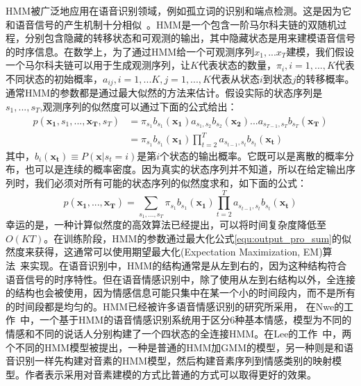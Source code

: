HMM被广泛地应用在语音识别领域，例如孤立词的识别和端点检测。这是因为它和语音信号的产生机制十分相似~\cite{Rabiner2007An}。HMM是一个包含一阶马尔科夫链的双随机过程，分别包含隐藏的转移状态和可观测的输出，其中隐藏状态是用来建模语音信号的时序信息。在数学上，为了通过HMM给一个可观测序列$x_1,...x_T$建模，我们假设一个马尔科夫链可以用于生成观测序列，让$K$代表状态的数量，$\pi_i, i=1,...,K$代表不同状态的初始概率，$a_{ij}, i=1,...K, j=1,...,K$代表从状态$i$到状态$j$的转移概率。通常HMM的参数都是通过最大似然的方法来估计。假设实际的状态序列是$s_1,...,s_T$,观测序列的似然度可以通过下面的公式给出：
\begin{equation}
\label{equ:output_pro}
    \begin{aligned}
        p(\mathbf{x_1},s_1,...,\mathbf{x_T},s_T) &= \pi_{s_1}b_{s_1}(\mathbf{x_1})a_{s_1,s_2}b_{s_2}(\mathbf{x_2})...a_{s_{T-1},s_T}b_{s_T}(\mathbf{x_T}) \\
        &= \pi_{s_1}b_{s_1}(\mathbf{x_1})\prod\limits_{t=2}^Ta_{s_{t-1},s_t}b_{s_t}(\mathbf{x_t})
    \end{aligned}
\end{equation}
其中，$b_i(\mathbf{x_t}) \equiv P(\mathbf{x}|s_t = i)$是第$i$个状态的输出概率。它既可以是离散的概率分布，也可以是连续的概率密度。因为真实的状态序列并不知道，所以在给定输出序列时，我们必须对所有可能的状态序列的似然度求和，如下面的公式：
\begin{equation}
\label{equ:output_pro_sum}
        p(\mathbf{x_1},...,\mathbf{x_T}) = \sum\limits_{s_1,...,s_T}\pi_{s_1}b_{s_1}(\mathbf{x_1})\prod\limits_{t=2}^Ta_{s_{t-1},s_t}b_{s_t}(\mathbf{x_t})
\end{equation}
幸运的是，一种计算似然度的高效算法已经提出，可以将时间复杂度降低至$O(KT)$。在训练阶段，HMM的参数通过最大化公式\ref{equ:output_pro_sum}的似然度来获得，这通常可以使用期望最大化(Expectation Maximization, EM)算法~\cite{Dempster1977Maximum}来实现。在语音识别中，HMM的结构通常是从左到右的，因为这种结构符合语音信号的时序特性。但在语音情感识别中，除了使用从左到右结构以外，全连接的结构也会被使用，因为情感信息可能只集中在某一个小的时间段内，而不是所有的时间段都是均匀的。HMM已经被许多语音情感识别的研究所采用， 在Nwe的工作~\cite{Nogueiras2012Speech}中，一个基于HMM的语音情感识别系统用于区分6种基本情感，模型为不同的情感和不同的说话人分别构建了一个四状态的全连接HMM。在Lee的工作~\cite{Lee2004Emotion}中，两个不同的HMM模型被提出，一种是普通的HMM加GMM的模型，另一种则是和语音识别一样先构建对音素的HMM模型，然后构建音素序列到情感类别的映射模型。作者表示采用对音素建模的方式比普通的方式可以取得更好的效果。

